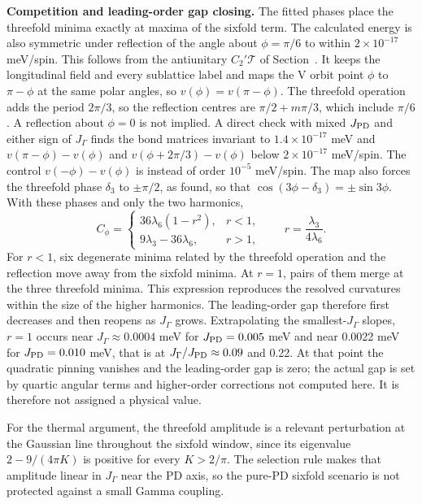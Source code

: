 \textbf{Competition and leading-order gap closing.} The fitted phases
place the threefold minima exactly at maxima of the sixfold term. The
calculated energy is also symmetric under reflection of the angle about
\(\phi=\pi/6\) to within \(2\times10^{-17}\) meV/spin. This follows from
the antiunitary \(C_2'\mathcal T\) of
Section~. It keeps the
longitudinal field and every sublattice label and maps the V orbit point
\(\phi\) to \(\pi-\phi\) at the same polar angles, so
\(v(\phi)=v(\pi-\phi)\). The threefold operation adds the period
\(2\pi/3\), so the reflection centres are \(\pi/2+m\pi/3\), which include
\(\pi/6\). A reflection about \(\phi=0\) is not implied. A direct check
with mixed \(J_{\rm PD}\) and either sign of \(J_\Gamma\) finds the bond
matrices invariant to \(1.4\times10^{-17}\) meV and
\(v(\pi-\phi)-v(\phi)\) and \(v(\phi+2\pi/3)-v(\phi)\) below
\(2\times10^{-17}\) meV/spin. The control \(v(-\phi)-v(\phi)\) is instead
of order \(10^{-5}\) meV/spin. The map also forces the threefold phase
\(\delta_3\) to \(\pm\pi/2\), as found, so that
\(\cos(3\phi-\delta_3)=\pm\sin3\phi\). With these phases and only the two
harmonics,
\begin{equation}\label{eq-nbcp-v-mixed-curvature}
C_\phi=\begin{cases}
36\lambda_6(1-r^2), & r<1,\\
9\lambda_3-36\lambda_6, & r>1,
\end{cases}
\qquad r=\frac{\lambda_3}{4\lambda_6}.
\end{equation}
For \(r<1\), six degenerate minima related by the threefold operation and
the reflection move away from the sixfold minima. At \(r=1\), pairs of
them merge at the three threefold minima. This expression reproduces the
resolved curvatures within the size of the higher harmonics. The
leading-order gap therefore first decreases and then reopens as
\(J_\Gamma\) grows. Extrapolating the smallest-\(J_\Gamma\) slopes, \(r=1\)
occurs near \(J_\Gamma\approx0.0004\) meV for \(J_{\rm PD}=0.005\) meV and
near 0.0022 meV for \(J_{\rm PD}=0.010\) meV, that is at
\(J_\Gamma/J_{\rm PD}\approx0.09\) and 0.22. At that point the quadratic
pinning vanishes and the leading-order gap is zero; the actual gap is set
by quartic angular terms and higher-order corrections not computed here.
It is therefore not assigned a physical value.

For the thermal argument, the threefold amplitude is a relevant
perturbation at the Gaussian line throughout the sixfold window, since
its eigenvalue \(2-9/(4\pi K)\) is positive for every \(K>2/\pi\). The
selection rule makes that amplitude linear in \(J_\Gamma\) near the PD
axis, so the pure-PD sixfold scenario is not protected against a small
Gamma coupling.

